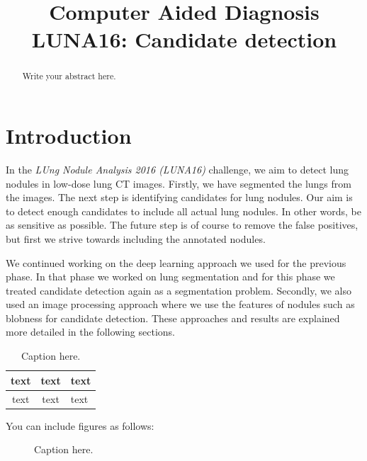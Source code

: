 \documentclass{article}
\title{Computer Aided Diagnosis\\LUNA16: Candidate detection}
\begin{document}
%
\maketitle
%
\begin{abstract}
Write your abstract here.
\end{abstract}


\section{Introduction}
\label{sec:intro}
In the \emph{LUng Nodule Analysis 2016 (LUNA16)} challenge, we aim to detect lung nodules in low-dose lung CT images. Firstly, we have segmented the lungs from the images. The next step is identifying candidates for lung nodules. Our aim is to detect enough candidates to include all actual lung nodules. In other words, be as sensitive as possible. The future step is of course to remove the false positives, but first we strive towards including the annotated nodules.

We continued working on the deep learning approach we used for the previous phase. In that phase we worked on lung segmentation and for this phase we treated candidate detection again as a segmentation problem. Secondly, we also used an image processing approach where we use the features of nodules such as blobness for candidate detection. These approaches and results are explained more detailed in the following sections.

\begin{table}[h]
\caption{\small{Caption here.}}
\label{tab:parameters}
\centering
\begin{tabular}{c | c | l}
text & text & text\\
\hline \hline
text & text & text
\end{tabular}
\end{table}

You can include figures as follows:

\begin{figure}[h]
\centering
{}
\caption{Caption here. \label{figure:patterns}}
\end{figure}
\end{document}
